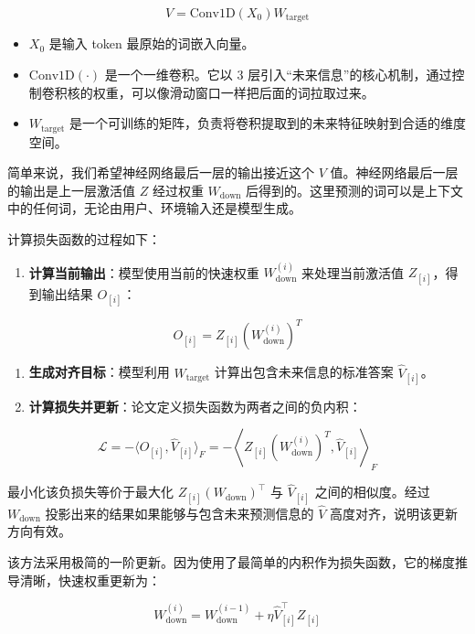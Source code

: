 \[
V = \mathrm{Conv1D}(X_0)W_{\mathrm{target}}
\]

\begin{itemize}
\tightlist
\item
  \(X_0\) 是输入 token 最原始的词嵌入向量。
\item
  \(\mathrm{Conv1D}(\cdot)\) 是一个一维卷积。它以 3 层引入``未来信息''的核心机制，通过控制卷积核的权重，可以像滑动窗口一样把后面的词拉取过来。
\item
  \(W_{\mathrm{target}}\) 是一个可训练的矩阵，负责将卷积提取到的未来特征映射到合适的维度空间。
\end{itemize}

简单来说，我们希望神经网络最后一层的输出接近这个 \(V\) 值。神经网络最后一层的输出是上一层激活值 \(Z\) 经过权重 \(W_{\mathrm{down}}\) 后得到的。这里预测的词可以是上下文中的任何词，无论由用户、环境输入还是模型生成。

计算损失函数的过程如下：

\begin{enumerate}
\def\labelenumi{\arabic{enumi}.}
\tightlist
\item
  \textbf{计算当前输出}：模型使用当前的快速权重 \(W_{\mathrm{down}}^{(i)}\) 来处理当前激活值 \(Z_{[i]}\)，得到输出结果 \(O_{[i]}\)：
\end{enumerate}

\[
O_{[i]} = Z_{[i]}\left(W_{\mathrm{down}}^{(i)}\right)^T
\]

\begin{enumerate}
\def\labelenumi{\arabic{enumi}.}
\setcounter{enumi}{1}
\tightlist
\item
  \textbf{生成对齐目标}：模型利用 \(W_{\mathrm{target}}\) 计算出包含未来信息的标准答案 \(\hat V_{[i]}\)。
\item
  \textbf{计算损失并更新}：论文定义损失函数为两者之间的负内积：
\end{enumerate}

\[
\mathcal{L}=-\langle O_{[i]},\hat V_{[i]}\rangle_F
=
-\left\langle Z_{[i]}\left(W_{\mathrm{down}}^{(i)}\right)^T,\hat V_{[i]}\right\rangle_F
\]

最小化该负损失等价于最大化 \(Z_{[i]}(W_{\mathrm{down}})^\top\) 与 \(\hat V_{[i]}\) 之间的相似度。经过 \(W_{\mathrm{down}}\) 投影出来的结果如果能够与包含未来预测信息的 \(\hat V\) 高度对齐，说明该更新方向有效。

该方法采用极简的一阶更新。因为使用了最简单的内积作为损失函数，它的梯度推导清晰，快速权重更新为：

\[
W_{\mathrm{down}}^{(i)}
=
W_{\mathrm{down}}^{(i-1)}
+ \eta \hat V_{[i]}^\top Z_{[i]}
\]

